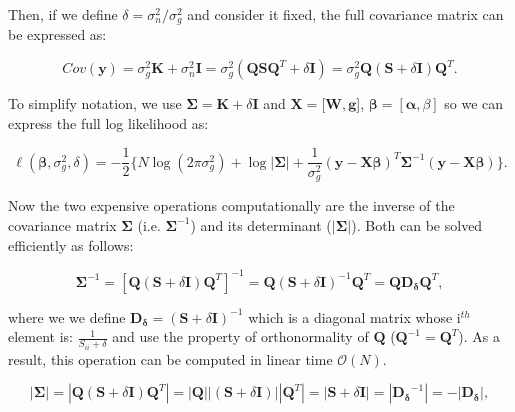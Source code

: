 Then, if we define $\delta = \sigma_n^2/\sigma_g^2$ and consider it fixed, the full covariance matrix can be expressed as:

\begin{equation}\label{eq:fast_lmm_full_covariance}
 Cov(\mathbf{y}) = \sigma_g^2\mathbf{K} + \sigma_n^2\mathbf{I} = \sigma_g^2(\mathbf{Q}\mathbf{S}\mathbf{Q}^T + \delta\mathbf{I})= \sigma_g^2\mathbf{Q} (\mathbf{S} + \delta\mathbf{I})\mathbf{Q}^T.
\end{equation}

\vspace{4mm}

To simplify notation, we use $\boldsymbol{\Sigma} = \mathbf{K} + \delta\mathbf{I}$ and $\mathbf{X} = [\mathbf{W}, \mathbf{g}$], $\boldsymbol{\beta} = [\boldsymbol{\alpha}, \beta]$ so we can express the full log likelihood as:

\begin{equation} \label{eq:fast_lmm_log_likelihood}
 \ell(\boldsymbol{\beta}, \sigma_g^2, \delta) = -\frac{1}{2} \bigg\{N\log(2\pi\sigma_g^2) + \log{|\boldsymbol{\Sigma}|}+ \frac{1}{\sigma_g^2}(\mathbf{y}-\mathbf{X}\boldsymbol{\beta})^T\boldsymbol{\Sigma}^{-1}(\mathbf{y}-\mathbf{X}\boldsymbol{\beta}) \bigg\}. 
\end{equation}

Now the two expensive operations computationally are the inverse of the covariance matrix $\boldsymbol{\Sigma}$ (i.e. $\boldsymbol{\Sigma}^{-1}$) and its determinant ($|\boldsymbol{\Sigma}|$). 
Both can be solved efficiently as follows:  

\begin{equation}\label{eq:fast_lmm_Sigma_inverse}
    \boldsymbol{\Sigma}^{-1} = [\mathbf{Q} (\mathbf{S} + \delta\mathbf{I})\mathbf{Q}^T]^{-1} = \mathbf{Q} (\mathbf{S} + \delta\mathbf{I})^{-1}\mathbf{Q}^T = \mathbf{Q} \mathbf{D_{\delta}}\mathbf{Q}^T,
\end{equation}

where we we define $\mathbf{D_{\delta}}=(\mathbf{S} + \delta\mathbf{I})^{-1}$ which is a diagonal matrix whose i$^{th}$ element is: $\frac{1}{S_{ii} + \delta}$ and use the property of orthonormality of $\mathbf{Q}$ ($\mathbf{Q}^{-1} = \mathbf{Q}^T$).
As a result, this operation can be computed in linear time $\mathcal{O}(N)$.

\begin{equation}\label{eq:fast_lmm_Sigma_determinant}
    |\boldsymbol{\Sigma}| = |\mathbf{Q} (\mathbf{S} + \delta\mathbf{I})\mathbf{Q}^T|= |\mathbf{Q}||(\mathbf{S} + \delta\mathbf{I})||\mathbf{Q}^T| = |\mathbf{S} + \delta\mathbf{I}| = |\mathbf{D_{\delta}}^{-1}| = - |\mathbf{D_{\delta}}|,
\end{equation}

